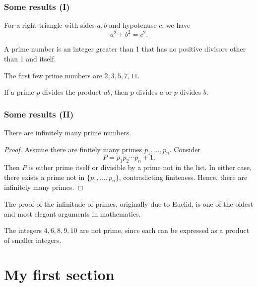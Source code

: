 \documentclass{beamerunicatt}
\begin{document}
\begin{frame}
\frametitle{Some results (I)}
\begin{theorem}[Pythagoras]
For a right triangle with sides $a, b$ and hypotenuse $c$, we have
\[
a^2 + b^2 = c^2.
\]
\end{theorem}

\begin{definition}
A prime number is an integer greater than 1 that has no positive divisors other than 1 and itself.
\end{definition}

\begin{example}
The first few prime numbers are $2, 3, 5, 7, 11$.
\end{example}

\begin{lemma}
If a prime $p$ divides the product $ab$, then $p$ divides $a$ or $p$ divides $b$.
\end{lemma}
\end{frame}

\begin{frame}
\frametitle{Some results (II)}
\begin{proposition}
There are infinitely many prime numbers.
\end{proposition}

\begin{proof}
Assume there are finitely many primes \(p_1,\dots,p_n\). Consider
\[
P = p_1 p_2 \cdots p_n + 1.
\]
Then \(P\) is either prime itself or divisible by a prime not in the list. In either case, there exists a prime not in \(\{p_1,\dots,p_n\}\), contradicting finiteness. Hence, there are infinitely many primes.
\end{proof}

\begin{remark}[Euclid]
The proof of the infinitude of primes, originally due to Euclid, is one of the oldest and most elegant arguments in mathematics.
\end{remark}

\begin{example}
The integers $4, 6, 8, 9, 10$ are not prime, since each can be expressed as a product of smaller integers.
\end{example}
\end{frame}

\section{My first section}
\end{document}
